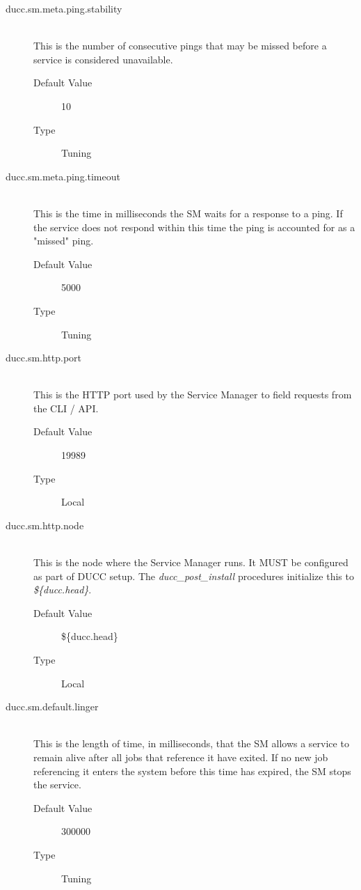 \begin{description}
      \item[ducc.sm.meta.ping.stability] \hfill \\
        This is the number of consecutive pings that may be missed before a
        service is considered unavailable. 
        \begin{description}
          \item[Default Value] 10 
          \item[Type] Tuning 
        \end{description}

      \item[ducc.sm.meta.ping.timeout] \hfill \\
        This is the time in milliseconds the SM waits for a response to a ping. If the service does 
        not respond within this time the ping is accounted for as a "missed" ping. 
        \begin{description}
          \item[Default Value] 5000 
          \item[Type] Tuning 
        \end{description}
        
      \item[ducc.sm.http.port] \hfill \\
        This is the HTTP port used by the Service Manager to field requests from the CLI / API. 
        \begin{description}          
          \item[Default Value] 19989 
          \item[Type] Local 
        \end{description}
        
      \item[ducc.sm.http.node] \hfill \\
        This is the node where the Service Manager runs. It MUST be configured as part of DUCC 
        setup. The {\em ducc\_post\_install} procedures initialize this to {\em \$\{ducc.head\}}.
        \begin{description}
          \item[Default Value] \$\{ducc.head\}
          \item[Type] Local 
        \end{description}
        
      \item[ducc.sm.default.linger] \hfill \\
        This is the length of time, in milliseconds, that the SM allows a service to remain alive after 
        all jobs that reference it have exited. If no new job referencing it enters the system before this time has 
        expired, the SM stops the service. 
        \begin{description}
          \item[Default Value] 300000
          \item[Type] Tuning 
        \end{description}
        

\end{description}
